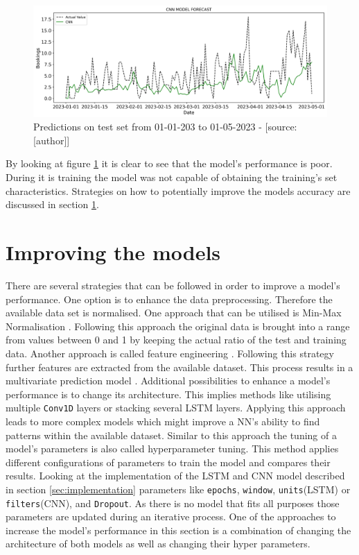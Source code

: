\begin{figure}[H]
	\centering
		\includegraphics[width=14cm]{images/cnn_1_prediction}
	\caption{Predictions on test set from 01-01-203 to 01-05-2023 - [source:[author]]}
	\label{fig:cnn_1_training_test}
\end{figure}
By looking at figure \ref{fig:cnn_1_training_test} it is clear to see that the model's performance is poor. During it is training the model was not capable of obtaining the training's set characteristics. Strategies on how to potentially improve the models accuracy are discussed in section \ref{sec:improving}.

\section{Improving the models}
\label{sec:improving}
There are several strategies that can be followed in order to improve a model's performance. One option is to enhance the data preprocessing. Therefore the available data set is normalised. One approach that can be utilised is Min-Max Normalisation \cite{min_max}. Following this approach the original data is brought into a range from values between 0 and 1 by keeping the actual ratio of the test and training data. 
Another approach is called feature engineering \cite{feature_eng}. Following this strategy further features are extracted from the available dataset. This process results in a multivariate prediction model \cite{multi}.
Additional possibilities to enhance a model's performance is to change its architecture. This implies methods like utilising multiple \verb|Conv1D| layers or stacking several LSTM layers. Applying this approach leads to more complex models which might improve a NN's ability to find patterns within the available dataset. Similar to this approach the tuning of a model's parameters is also called hyperparameter tuning.  This method applies different configurations of parameters to train the model and compares their results. Looking at the implementation of the LSTM  and CNN model described in section \ref{sec:implementation} parameters like \verb|epochs|, \verb|window|, \verb|units|(LSTM) or \verb|filters|(CNN), and \verb|Dropout|. As there is no model that fits all purposes those parameters are updated during an iterative process. \newline
One of the approaches to increase the model's performance in this section is a combination of changing the architecture of both models as well as changing their hyper parameters. 

